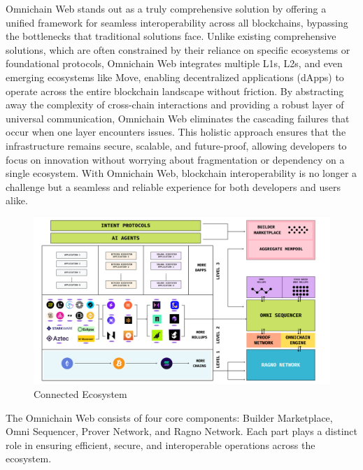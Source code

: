 Omnichain Web stands out as a truly comprehensive solution by offering a unified framework for seamless interoperability across all blockchains, bypassing the bottlenecks that traditional solutions face. Unlike existing comprehensive solutions, which are often constrained by their reliance on specific ecosystems or foundational protocols, Omnichain Web integrates multiple L1s, L2s, and even emerging ecosystems like Move, enabling decentralized applications (dApps) to operate across the entire blockchain landscape without friction. By abstracting away the complexity of cross-chain interactions and providing a robust layer of universal communication, Omnichain Web eliminates the cascading failures that occur when one layer encounters issues. This holistic approach ensures that the infrastructure remains secure, scalable, and future-proof, allowing developers to focus on innovation without worrying about fragmentation or dependency on a single ecosystem. With Omnichain Web, blockchain interoperability is no longer a challenge but a seamless and reliable experience for both developers and users alike.

\begin{figure}[h]
    \centering
    \includegraphics[width=0.99\linewidth]{figure/connected.png}
    \caption{Connected Ecosystem}
    \label{fig:connected}
\end{figure}

The Omnichain Web consists of four core components: Builder Marketplace, Omni Sequencer, Prover Network, and Ragno Network. Each part plays a distinct role in ensuring efficient, secure, and interoperable operations across the ecosystem.

